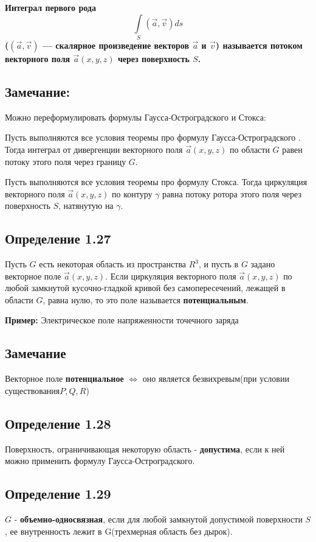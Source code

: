 \documentclass[12pt]{article}
\begin{document}
\textbf{Интеграл первого рода}
	$$\int\limits_{S} (\vec{a} , \vec{v})ds$$
\textbf{($(\vec{a} , \vec{v})$ — скалярное произведение векторов $\vec{a}$ и $\vec{v}$) называется потоком векторного поля $\vec{a}(x, y, z)$ через поверхность $S$.}

\subsection{Замечание:}
	Можно переформулировать формулы Гаусса-Остроградского и Стокса:
	
	Пусть выполняются все условия теоремы про формулу Гаусса-Остроградского . Тогда интеграл от дивергенции векторного поля $\vec{a}(x, y, z)$ по области $G$ равен потоку этого поля через границу $G$.


	Пусть выполняются все условия теоремы про формулу Стокса. Тогда циркуляция векторного поля $\vec{a}(x, y, z)$ по контуру $\gamma$ равна потоку ротора этого поля через поверхность $S$, натянутую на $\gamma$.
	
\subsection{Определение 1.27}
Пусть $G$ есть некоторая область из пространства $R^3$, и пусть в $G$ задано
векторное поле $\vec{a}(x, y, z).$
Если циркуляция векторного поля $\vec{a}(x, y, z)$ по любой замкнутой кусочно-гладкой кривой без самопересечений, лежащей в области $G$, равна нулю, то это поле называется \textbf{потенциальным}.

\textbf{Пример:} Электрическое поле напряженности точечного заряда
	
\subsection{Замечание}
	Векторное поле \textbf{потенциальное} $\Leftrightarrow$ оно является безвихревым(при условии существования$ P, Q, R$)
	
\subsection{Определение 1.28}	
	Поверхность, ограничивающая некоторую область - \textbf{допустима}, если к ней можно применить формулу Гаусса-Остроградского.
	
\subsection{Определение 1.29}
	$G$ - \textbf{объемно-односвязная}, если для любой замкнутой допустимой поверхности $S$, ее внутренность лежит в G(трехмерная область без дырок).
	
\end{document}

